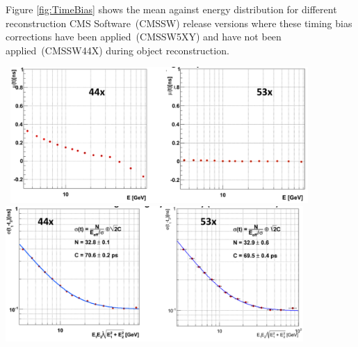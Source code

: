 Figure \ref{fig:TimeBias} shows the mean against energy distribution for different reconstruction CMS Software~(CMSSW) release versions where these timing bias corrections have been applied~(CMSSW5XY) and have not been applied~(CMSSW44X) during object reconstruction. 
\begin{center}
\centering
\mbox{
\includegraphics[height=0.450\textwidth, width=0.85\textwidth]{THESISPLOTS/AmplitudeVsTimeCMSSW_Comparison.png} } 
\vspace{5cm}
\mbox{
\includegraphics[height=0.460\textwidth, width=0.85\textwidth]{THESISPLOTS/TimingResolutionCMSSW_Comparison.png}
}
\vspace{-5cm}
\label{fig:TimeBias}
\end{center}

